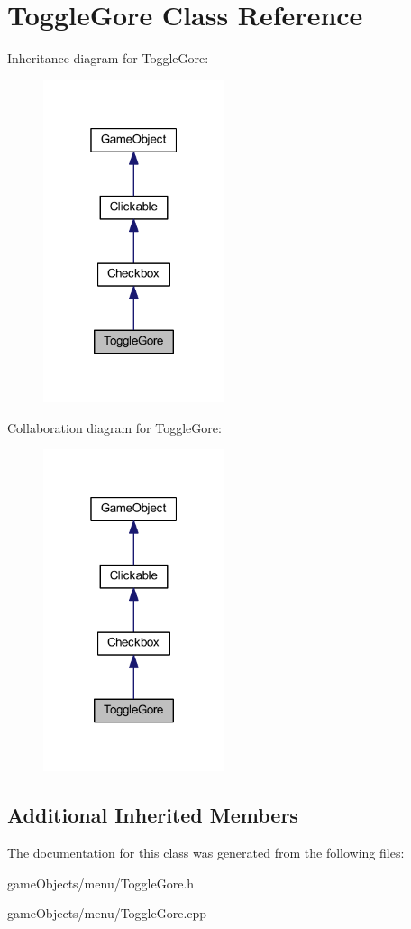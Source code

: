 \hypertarget{class_toggle_gore}{\section{Toggle\+Gore Class Reference}
\label{class_toggle_gore}
}


Inheritance diagram for Toggle\+Gore\+:\nopagebreak
\begin{figure}[H]
\begin{center}
\leavevmode
\includegraphics[width=151pt]{class_toggle_gore__inherit__graph}
\end{center}
\end{figure}


Collaboration diagram for Toggle\+Gore\+:\nopagebreak
\begin{figure}[H]
\begin{center}
\leavevmode
\includegraphics[width=151pt]{class_toggle_gore__coll__graph}
\end{center}
\end{figure}
\subsection*{Additional Inherited Members}


The documentation for this class was generated from the following files\+:\begin{DoxyCompactItemize}
\item 
game\+Objects/menu/Toggle\+Gore.\+h\item 
game\+Objects/menu/Toggle\+Gore.\+cpp\end{DoxyCompactItemize}
